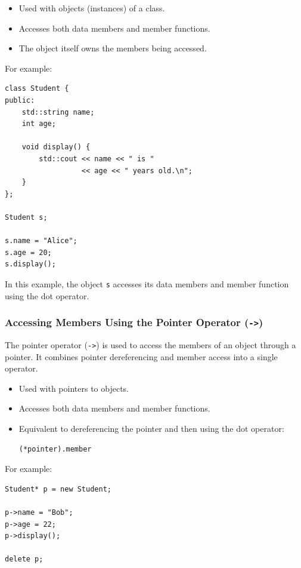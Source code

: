 \documentclass[10pt]{article}
\begin{document}
\begin{itemize}
    \item Used with objects (instances) of a class.
    \item Accesses both data members and member functions.
    \item The object itself owns the members being accessed.
\end{itemize}

For example:

\begin{verbatim}
class Student {
public:
    std::string name;
    int age;

    void display() {
        std::cout << name << " is "
                  << age << " years old.\n";
    }
};

Student s;

s.name = "Alice";
s.age = 20;
s.display();
\end{verbatim}

In this example, the object \texttt{s} accesses its data members and member function using the dot operator.

\newpage
\subsubsection{Accessing Members Using the Pointer Operator (\texttt{->})}

The pointer operator (\texttt{->}) is used to access the members of an object through a pointer. It combines pointer dereferencing and member access into a single operator.

\begin{itemize}
    \item Used with pointers to objects.
    \item Accesses both data members and member functions.
    \item Equivalent to dereferencing the pointer and then using the dot operator:
    \begin{verbatim}
(*pointer).member
    \end{verbatim}
\end{itemize}

For example:

\begin{verbatim}
Student* p = new Student;

p->name = "Bob";
p->age = 22;
p->display();

delete p;
\end{verbatim}
\end{document}
